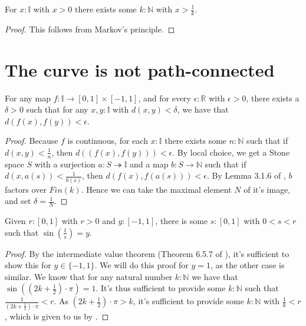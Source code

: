 \documentclass{../util/zariski}
\begin{document}
\begin{lemma}\label{postiveNumbersCharacter}
  For $x:\mathbb I$ with $x>0$ there exists some $k:\mathbb N$ with $x>\frac1k$. 
\end{lemma}
\begin{proof}
  This follows from Markov's principle.
\end{proof}

\section{The curve is not path-connected}
\begin{lemma}\label{uniformContinuity}
  For any map $f:\mathbb I \to [0,1] \times [-1,1]$, and for every $\epsilon:\mathbb R$ with $\epsilon>0$, 
  there exists a $\delta>0$ such that for any $x,y:\mathbb I$ with $d(x,y)<\delta$, we have
  that $d(f(x) , f(y))<\epsilon$.
\end{lemma}
\begin{proof}
  Because $f$ is continuous, for each $x:\mathbb I$ there exists some $n:\mathbb N$ such that 
  if $d(x,y)<\frac1n$, then $d((f(x), f(y)))<\epsilon$. 
  By local choice, we get a Stone space $S$ with a surjection $a:S\twoheadrightarrow \mathbb I$ 
  and a map $b:S\to \mathbb N$ such that if $d(x,a(s))<\frac1{b(s)}$, then $d(f(x), f(a(s)))<\epsilon$. 
  By Lemma 3.1.6 of \cite{synthetic-stone-duality}, $b$ factors over $Fin(k)$. 
  Hence we can take the maximal element $N$ of it's image, and set $\delta = \frac1N$. 
\end{proof}
\begin{lemma}\label{sinCharacter}
  Given $r:[0,1]$ with $r>0$ and 
  $y:[-1,1]$, there is some $s:[0,1]$ with $0<s<r$ such that 
  $\sin(\frac1s) = y$. 
\end{lemma}
\begin{proof}
  By the intermediate value theorem (Theorem 6.5.7 of \cite{synthetic-stone-duality}), 
  it's sufficient to show this for $y \in \{-1,1\}$. 
  We will do this proof for $y = 1$, as the other case is similar. 
  We know that for any natural number $k:\mathbb N$ we have that 
  $\sin( (2 k + \frac12)\cdot \pi) = 1$. 
  It's thus sufficient to provide some $k:\mathbb N$ such that $\frac1{(2k+\frac12)\cdot \pi}<r$. 
  As $(2k+\frac12)\cdot \pi>k$, it's sufficient to provide some $k:\mathbb N$ with $\frac1k<r$, 
  which is given to us by .
\end{proof}
\end{document}
